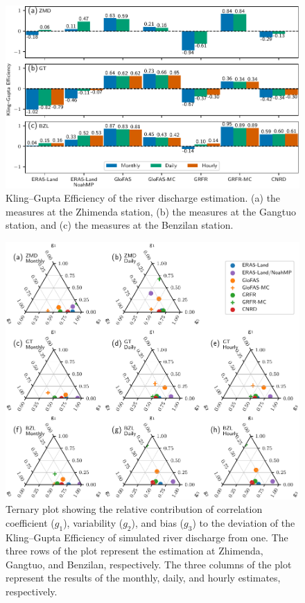 \documentclass[preprint, review, authoryear, longtitle, 12pt, 3p]{elsarticle}
\begin{document}
\begin{figure}[ht!]
  \centering
  \includegraphics[width=\textwidth]{streamflow_kge.pdf}
  \caption{Kling--Gupta Efficiency of the river discharge estimation. (a) the measures at the Zhimenda station, (b) the measures at the Gangtuo station, and (c) the measures at the Benzilan station.}
  \label{fig:streamflow_kge}
\end{figure}

\begin{figure}[ht!]
  \centering
  \includegraphics[width=\textwidth]{streamflow_kge_comp.pdf}
  \caption{Ternary plot showing the relative contribution of correlation coefficient ($g_1$), variability ($g_2$), and bias ($g_3$) to the deviation of the Kling--Gupta Efficiency of simulated river discharge from one. The three rows of the plot represent the estimation at Zhimenda, Gangtuo, and Benzilan, respectively. The three columns of the plot represent the results of the monthly, daily, and hourly estimates, respectively.}
  \label{fig:streamflow_kge_comp}
\end{figure}
\end{document}
